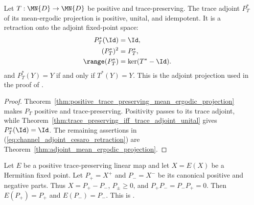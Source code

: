 \begin{theorem}
    \label{thm:positive_unital_adjoint_mean_ergodic_retraction}
    \leanok
    Let $T:\MN{D}\to\MN{D}$ be positive and trace-preserving. The trace
    adjoint $P_T^*$ of its mean-ergodic projection is positive, unital, and
    idempotent. It is a retraction onto the adjoint fixed-point space:
    \begin{align}
        P_T^*(\Id)    & =\Id, \notag    \\
        (P_T^*)^2     & =P_T^*, \notag  \\
        \range(P_T^*) & =\ker(T^*-\Id).
        \label{eq:channel_adjoint_cesaro_retraction}
    \end{align}
    and $P_T^*(Y)=Y$ if and only if $T^*(Y)=Y$.
    This is the adjoint projection used in the proof of
    \cite[Theorem~6.14]{Wolf2012Quantum}.
\end{theorem}

\begin{proof}\leanok
    Theorem~\ref{thm:positive_trace_preserving_mean_ergodic_projection} makes
    $P_T$ positive and trace-preserving. Positivity passes to its trace
    adjoint, while
    Theorem~\ref{thm:trace_preserving_iff_trace_adjoint_unital} gives
    $P_T^*(\Id)=\Id$. The remaining assertions in
    (\ref{eq:channel_adjoint_cesaro_retraction}) are
    Theorem~\ref{thm:adjoint_mean_ergodic_projection}.
\end{proof}

\begin{theorem}\label{thm:hermitian_fixedpoint_parts}
    \leanok
    Let $E$ be a positive trace-preserving linear map and let $X=E(X)$ be a
    Hermitian fixed point. Let $P_+=X^+$ and $P_-=X^-$ be its canonical
    positive and negative parts. Thus $X=P_+-P_-$, $P_\pm\geq0$, and
    $P_+P_-=P_-P_+=0$. Then $E(P_+)=P_+$ and $E(P_-)=P_-$.
    This is \cite[Proposition~6.8]{Wolf2012Quantum}.
\end{theorem}

